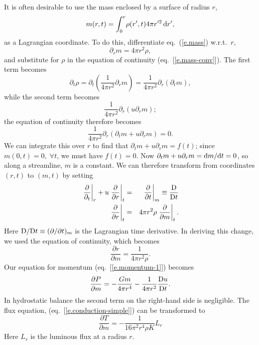 It is often desirable to use the mass enclosed by a surface of radius $r$,
\begin{equation}\label{e.mass}
	m(r,t) = \int_{0}^{r}\! \rho(r',t) 4\pi r'^{2} \,\mathrm{d} r',
\end{equation}
as a Lagrangian coordinate.
To do this, differentiate eq.~(\ref{e.mass}) w.r.t.\ $r$,
\[ \partial_{r}m = 4\pi r^{2}\rho, \]
and substitute for $\rho$ in the equation of  continuity (eq.~[\ref{e.mass-conv}]).  The first term becomes
\[ 
	\partial_{t}\rho = \partial_{t}\left(\frac{1}{4\pi r^{2}} \partial_{r} m\right) 
	= \frac{1}{4\pi r^{2}}\partial_{r}(\partial_{t}m),
\]
while the second term becomes
\[
	\frac{1}{4\pi r^{2}}\partial_{r}\left(u\partial_{r}m\right);
\]
the equation of continuity therefore becomes
\begin{equation}\label{e.mod-continuity}
	\frac{1}{4\pi r^{2}} \partial_{r}\left( \partial_{t} m + u\partial_{r} m\right) = 0.
\end{equation}
We can integrate this over $r$ to find that $\partial_{t} m + u\partial_{r} m = f(t)$; since $m(0,t) = 0,\;\forall t$, we must have $f(t) = 0$.  Now $\partial_{t} m + u\partial_{r} m = \mathrm{d} m/\mathrm{d} t = 0$, so along a streamline, $m$ is a constant.  We can therefore transform from coordinates $(r,t)$ to $(m,t)$ by setting
\begin{eqnarray}
	\label{e.lagrange-rule-1}
	\left.\frac{\partial}{\partial_{t}}\right|_{r} + u\left.\frac{\partial}{\partial r}\right|_{t} 
	&=& \left.\frac{\partial}{\partial t}\right|_{m} \equiv \frac{\mathrm{D}}{\mathrm{D} t}\\
	\label{e.lagrange-rule-2}
	\left.\frac{\partial}{\partial r}\right|_{t} &=& 4\pi r^{2}\rho \left.\frac{\partial}{\partial m}\right|_{t}.
\end{eqnarray}
Here $\mathrm{D}/\mathrm{D} t \equiv (\partial/\partial t)_{m}$ is the Lagrangian time derivative.  In deriving this change, we used the equation of continuity, which becomes
\begin{equation}\label{e.lagrange-r}
\frac{\partial r}{\partial m} = \frac{1}{4\pi r^{2}\rho}.
\end{equation}
Our equation for momentum (eq.~[\ref{e.momentum-1}]) becomes
\begin{equation}\label{e.lagrange-momentum}
\frac{\partial P}{\partial m} = -\frac{Gm}{4\pi r^{4}} - \frac{1}{4\pi r^{2}}\frac{\mathrm{D} u}{\mathrm{D} t}.
\end{equation}
In hydrostatic balance the second term on the right-hand side is negligible.  
The flux equation, (eq.~[\ref{e.conduction-simple}]) can be transformed to
\begin{equation}\label{e.lagrange-flux}
\frac{\partial T}{\partial m} = - \frac{1}{16\pi^{2} r^{4}\rho K}L_{r}
\end{equation}
Here $L_{r}$ is the luminous flux at a radius $r$. 

